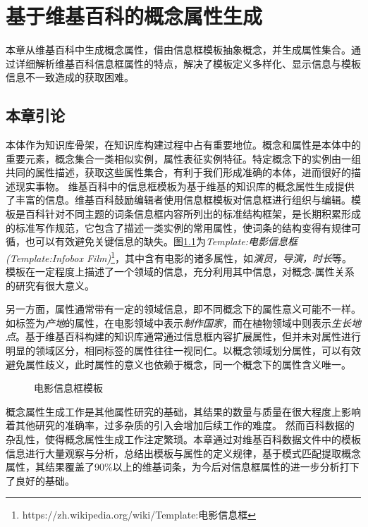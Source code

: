 \chapter{基于维基百科的概念属性生成}
\label{cha:concept-property}
本章从维基百科中生成概念属性，借由信息框模板抽象概念，并生成属性集合。通过详细解析维基百科信息框属性的特点，解决了模板定义多样化、显示信息与模板信息不一致造成的获取困难。

\section{本章引论}

本体作为知识库骨架，在知识库构建过程中占有重要地位。概念和属性是本体中的重要元素，概念集合一类相似实例，属性表征实例特征。特定概念下的实例由一组共同的属性描述，获取这些属性集合，有利于我们形成准确的本体，进而很好的描述现实事物。
维基百科中的信息框模板为基于维基的知识库的概念属性生成提供了丰富的信息。维基百科鼓励编辑者使用信息框模板对信息框进行组织与编辑。模板是百科针对不同主题的词条信息框内容所列出的标准结构框架，是长期积累形成的标准写作规范，它包含了描述一类实例的常用属性，使词条的结构变得有规律可循，也可以有效避免关键信息的缺失。图\ref{fig:template-infobox-film}为\textit{Template:电影信息框(Template:Infobox Film)}\footnote{https://zh.wikipedia.org/wiki/Template:电影信息框}，其中含有电影的诸多属性，如\textit{演员，导演，时长}等。模板在一定程度上描述了一个领域的信息，充分利用其中信息，对概念-属性关系的研究有很大意义。

另一方面，属性通常带有一定的领域信息，即不同概念下的属性意义可能不一样。如标签为\textit{产地}的属性，在电影领域中表示\textit{制作国家}，而在植物领域中则表示\textit{生长地点}。基于维基百科构建的知识库通常通过信息框内容扩展属性，但并未对属性进行明显的领域区分，相同标签的属性往往一视同仁。以概念领域划分属性，可以有效避免属性歧义，此时属性的意义也依赖于概念，同一个概念下的属性含义唯一。

\begin{figure}[ht]
  \centering
  \caption{电影信息框模板}
  \label{fig:template-infobox-film}
\end{figure}

概念属性生成工作是其他属性研究的基础，其结果的数量与质量在很大程度上影响着其他研究的准确率，过多杂质的引入会增加后续工作的难度。
然而百科数据的杂乱性，使得概念属性生成工作注定繁琐。本章通过对维基百科数据文件中的模板信息进行大量观察与分析，总结出模板与属性的定义规律，基于模式匹配提取概念属性，其结果覆盖了90\%以上的维基词条，为今后对信息框属性的进一步分析打下了良好的基础。

